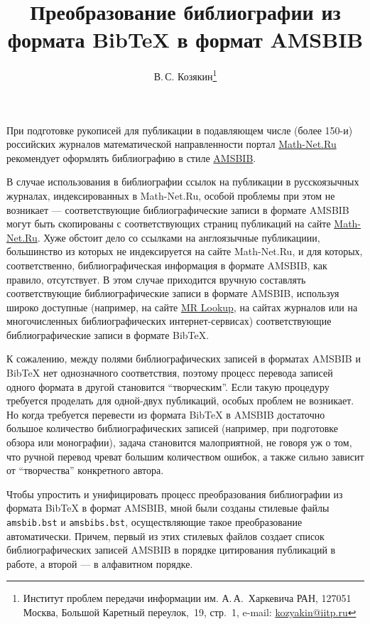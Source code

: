 \documentclass[a4paper]{article}
\title{Преобразование библиографии из формата Bib\TeX{} в формат AMSBIB}
\author{В.\,С. Козякин\thanks{Институт проблем передачи информации им.
А.\,А.~Харкевича РАН, 127051 Москва, Большой Каретный переулок,~19, стр.~1,
e-mail: \href{mailto:kozyakin@iitp.ru}{kozyakin@iitp.ru}}}
\begin{document}
\maketitle

При подготовке рукописей для публикации в подавляющем числе (более 150-и) российских журналов математической направленности портал \href{https://www.mathnet.ru/}{Math-Net.Ru} рекомендует оформлять библиографию в стиле \href{https://www.mathnet.ru/poffice/amsbibpackage.phtml?wshow=amsbibpackage&option_lang=rus}{AMSBIB}.

В случае использования в библиографии ссылок на публикации в русскоязычных журналах, индексированных в Math-Net.Ru, особой проблемы при этом не возникает --- соответствующие библиографические записи в формате AMSBIB могут быть скопированы с соответствующих страниц публикаций на сайте \href{https://www.mathnet.ru/}{Math-Net.Ru}. Хуже обстоит дело со ссылками на англоязычные публикациии, большинство из которых не индексируется на сайте Math-Net.Ru, и для которых, соответственно, библиографическая информация в формате AMSBIB, как правило, отсутствует. В этом случае приходится вручную составлять соответствующие библиографические записи в формате AMSBIB, используя широко доступные (например, на сайте \href{https://mathscinet.ams.org/mrlookup}{MR Lookup}, на сайтах журналов или на многочисленных библиографических интернет-сервисах) соответствующие библиографические записи в формате Bib\TeX. 

К сожалению, между полями библиографических записей в форматах AMSBIB и Bib\TeX{} нет однозначного соответствия, поэтому процесс перевода записей одного формата в другой становится ``творческим''. Если такую процедуру требуется проделать для одной-двух публикаций, особых проблем не возникает. Но когда требуется перевести из формата Bib\TeX{} в AMSBIB достаточно большое количество библиографических записей (например, при подготовке обзора или монографии), задача становится малоприятной, не говоря уж о том, что ручной перевод чреват большим количеством ошибок, а также сильно зависит от ``творчества'' конкретного автора.

Чтобы упростить и унифицировать процесс преобразования библиографии из формата Bib\TeX{} в формат AMSBIB, мной были созданы стилевые файлы \texttt{amsbib.bst} и \texttt{amsbibs.bst}, осуществляющие такое преобразование автоматически. Причем, первый из этих стилевых файлов создает список библиографических записей AMSBIB в порядке цитирования публикаций в работе, а второй --- в алфавитном порядке. 
\end{document}
